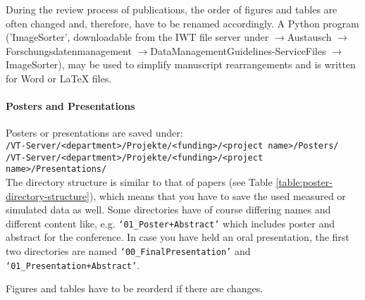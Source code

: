 During the review process of publications, the order of figures and tables are often changed and, therefore, have to be renamed accordingly. A Python program ('ImageSorter', downloadable from the IWT file server under $\rightarrow$Austausch $\rightarrow$Forschungsdatenmanagement $\rightarrow$Data\-ManagementGuidelines-ServiceFiles  $\rightarrow$ImageSorter), may be used to simplify manuscript rearrangements and is written for Word or LaTeX files.


\paragraph{Posters and Presentations}

\begin{table}[!h]
  \caption{%
  The data of every poster has to be saved in seven subdirectories;
  further remarks: \\
  **When the poster was presented, the corresponding presenter loads the last
  and revised version (i.e. only the real used but absolutely complete data)
  into the protected directory \\
  ***If the data reproduced in a figure/table is from distributed raw data
  directories, it is sufficient to save here only the generating program%
  }

\label{table:poster-directory-structure}
\end{table}

\noindent Posters or presentations are saved under: \\
\texttt{/VT-Server/<department>/Projekte/<funding>/<project name>/Posters/} \\
\texttt{/VT-Server/<department>/Projekte/<funding>/<project name>/Presentations/} \\
The directory structure is similar to that of papers (see Table \ref{table:poster-directory-structure}), which means that you have
to save the used measured or simulated data as well. Some directories have of
course differing names and different content like, e.g.
\texttt{‘01\_Poster+Abstract’} which includes poster and abstract for the
conference. In case you have held an oral presentation, the first two
directories are named \texttt{‘00\_FinalPresentation’} and
\texttt{‘01\_Presentation+Abstract’}.

Figures and tables have to be reorderd if there are changes.


